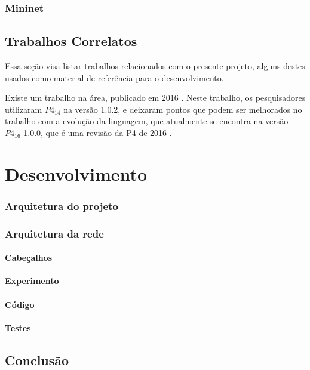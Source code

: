 \documentclass[12pt,
openright, 
oneside,
a4paper,
brazil]{facom-ufu-abntex2}
\begin{document}
\subsection{Mininet}


\section{Trabalhos Correlatos}
Essa seção visa listar trabalhos relacionados com o presente projeto, alguns destes usados
como material de referência para o desenvolvimento.

Existe um trabalho na área, publicado em 2016 \citep{dang2016paxos}. Neste trabalho,
os pesquisadores utilizaram $P4_{14}$ na versão 1.0.2, e deixaram pontos que podem ser
melhorados no trabalho com a evolução da linguagem, que atualmente se encontra na versão
$P4_{16}$ 1.0.0, que é uma revisão da P4 de 2016 \citep{paxos16spec}.


\chapter{Desenvolvimento}
 
\subsection{Arquitetura do projeto}
\subsection{Arquitetura da rede}
\subsubsection{Cabeçalhos}
\subsubsection{Experimento}
\subsubsection{Código}
\subsubsection{Testes}

\section{Conclusão}





\end{document}
